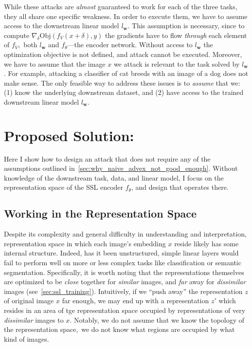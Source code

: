While these attacks are \textit{almost} guaranteed to work for each of the three tasks, they all share one specific weakness. In order to execute them, we have to assume access to the downstream linear model $l_\mathbf{w}$. This assumption is necessary, since to compute $\nabla_\delta\text{Obj}(f_V(x+\delta),y)$ the gradients have to flow \textit{through} each element of $f_V$,~\ie both $l_\mathbf{w}$ and $f_\theta$---the encoder network. Without access to $l_\mathbf{w}$ the optimization objective is not defined, and attack cannot be executed. Moreover, we have to assume that the image $x$ we attack is relevant to the task solved by $l_\mathbf{w}$. For example, attacking a classifier of cat breeds with an image of a dog does not make sense. The only feasible way to address these issues is to \textit{assume} that we: (1) know the underlying downstream dataset, and (2) have access to the trained downstream linear model $l_\mathbf{w}$. 

\section{Proposed Solution: \EmbedAttack}

Here I show how to design an attack that does not require any of the assumptions outlined in~\cref{sec:why_naive_advex_not_good_enough}. Without knowledge of the downstream task, data, and linear model, I focus on the representation space of the SSL encoder $f_\theta$, and design \EmbedAttack that operates there. 

\subsection{Working in the Representation Space}\label{sec:embatk_intuition}

Despite its complexity and general difficulty in understanding and interpretation, representation space in which each image's embedding $x$ reside likely has some internal structure. Indeed, has it been unstructured, simple linear layers would fail to perform well on more or less complex tasks like classification or semantic segmentation. Specifically, it is worth noting that the representations themselves are optimized to be \textit{close} together for \textit{similar} images, and \textit{far} away for \textit{dissimilar} images (see~\cref{sec:ssl_training}). Intuitively, if we ``push away'' the representation $z$ of original image $x$ far enough, we may end up with a representation $z'$ which resides in an area of tge representation space occupied by representations of very \textit{dissimilar} images to $x$. Notably, we do not assume that we know the topology of the representation space,~\ie we do not know what regions are occupied by what kind of images. 

